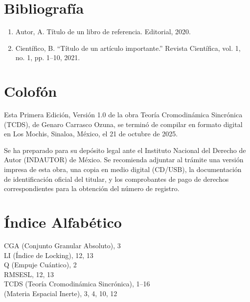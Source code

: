\documentclass[12pt,openright]{book}
\begin{document}
\clearpage

\backmatter

\chapter*{Bibliografía}
\begin{enumerate}
  \item Autor, A. Título de un libro de referencia. Editorial, 2020.
  \item Científico, B. ``Título de un artículo importante.'' Revista Científica, vol. 1, no. 1, pp. 1--10, 2021.
\end{enumerate}

\chapter*{Colofón}
Esta Primera Edición, Versión 1.0 de la obra Teoría Cromodinámica Sincrónica (TCDS), de Genaro Carrasco Ozuna, se terminó de compilar en formato digital en Los Mochis, Sinaloa, México, el 21 de octubre de 2025.

Se ha preparado para su depósito legal ante el Instituto Nacional del Derecho de Autor (INDAUTOR) de México. Se recomienda adjuntar al trámite una versión impresa de esta obra, una copia en medio digital (CD/USB), la documentación de identificación oficial del titular, y los comprobantes de pago de derechos correspondientes para la obtención del número de registro.

\clearpage

\chapter*{Índice Alfabético}
\begin{multicols}{2}
\noindent CGA (Conjunto Granular Absoluto), 3 \\
\noindent LI (Índice de Locking), 12, 13 \\
\noindent Q (Empuje Cuántico), 2 \\
\noindent RMSESL, 12, 13 \\
\noindent TCDS (Teoría Cromodinámica Sincrónica), 1--16 \\
\noindent (Materia Espacial Inerte), 3, 4, 10, 12 \\
\end{multicols}
\end{document}
